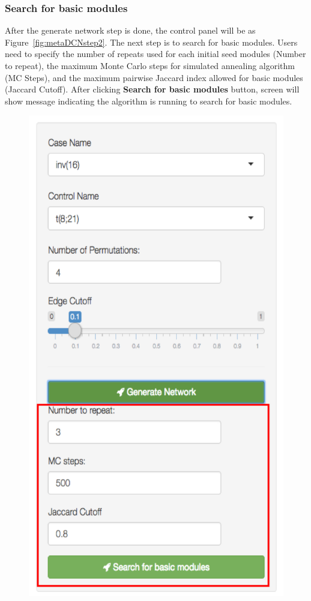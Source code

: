 \subsubsection{Search for basic modules}
After the generate network step is done, the control panel will be as Figure~\ref{fig:metaDCNstep2}. The next step is to search for basic modules. Users need to specify the number of repeats used for each initial seed modules (Number to repeat), the maximum Monte Carlo steps for simulated annealing algorithm (MC Steps), and the maximum pairwise Jaccard index allowed for basic modules (Jaccard Cutoff). After clicking \textbf{Search for basic modules} button, screen will show message indicating the algorithm is running to search for basic modules.

\begin{figure}[H]
\begin{center}
\includegraphics[scale=0.35]{./figure/metaDCN/metaDCNstep2}

\end{center}
\end{figure}
